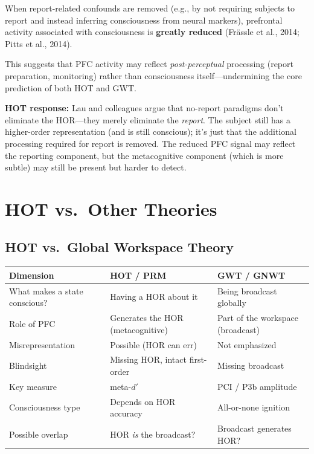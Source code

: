 \documentclass[11pt,a4paper]{report}
\begin{document}
\begin{objbox}
When report-related confounds are removed (e.g., by not requiring subjects to report and instead inferring consciousness from neural markers), prefrontal activity associated with consciousness is \textbf{greatly reduced} (Frässle et al., 2014; Pitts et al., 2014).

This suggests that PFC activity may reflect \emph{post-perceptual} processing (report preparation, monitoring) rather than consciousness itself---undermining the core prediction of both HOT and GWT.
\end{objbox}

\textbf{HOT response:} Lau and colleagues argue that no-report paradigms don't eliminate the HOR---they merely eliminate the \emph{report}. The subject still has a higher-order representation (and is still conscious); it's just that the additional processing required for report is removed. The reduced PFC signal may reflect the reporting component, but the metacognitive component (which is more subtle) may still be present but harder to detect.


\chapter{HOT vs.\ Other Theories}

\section{HOT vs.\ Global Workspace Theory}

\begin{compbox}
\renewcommand{\arraystretch}{1.4}
\begin{tabular}{>{\raggedright}p{3cm} >{\raggedright}p{5cm} >{\raggedright\arraybackslash}p{5cm}}
  \toprule
  \textbf{Dimension} & \textbf{HOT / PRM} & \textbf{GWT / GNWT} \\
  \midrule
  What makes a state conscious? & Having a HOR about it & Being broadcast globally \\
  Role of PFC & Generates the HOR (metacognitive) & Part of the workspace (broadcast) \\
  Misrepresentation & Possible (HOR can err) & Not emphasized \\
  Blindsight & Missing HOR, intact first-order & Missing broadcast \\
  Key measure & meta-$d'$ & PCI / P3b amplitude \\
  Consciousness type & Depends on HOR accuracy & All-or-none ignition \\
  Possible overlap & HOR \emph{is} the broadcast? & Broadcast generates HOR? \\
  \bottomrule
\end{tabular}
\end{compbox}
\end{document}
